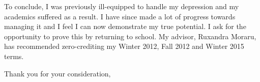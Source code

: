 \documentclass{letter}
\begin{document}
\begin{letter}{}
    To conclude, I was previously ill-equipped to handle my depression
    and my academics suffered as a result.
    I have since made a lot of progress towards managing it
    and I feel I can now demonstrate my true potential.
    I ask for the opportunity to prove this by returning to school.
    My advisor, Ruxandra Moraru, has recommended zero-crediting my
    Winter 2012, Fall 2012 and Winter 2015 terms.

    \closing{Thank you for your consideration,}
\end{letter}
\end{document}
